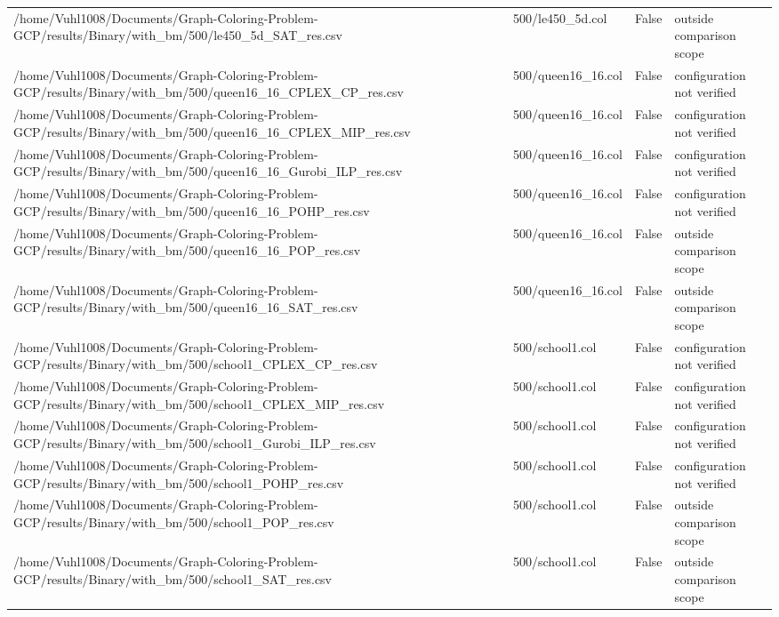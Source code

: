 \begin{table}[htbp]
\begin{tabular}{llll}
/home/Vuhl1008/Documents/Graph-Coloring-Problem-GCP/results/Binary/with\_bm/500/le450\_5d\_SAT\_res.csv & 500/le450\_5d.col & False & outside comparison scope \\
/home/Vuhl1008/Documents/Graph-Coloring-Problem-GCP/results/Binary/with\_bm/500/queen16\_16\_CPLEX\_CP\_res.csv & 500/queen16\_16.col & False & configuration not verified \\
/home/Vuhl1008/Documents/Graph-Coloring-Problem-GCP/results/Binary/with\_bm/500/queen16\_16\_CPLEX\_MIP\_res.csv & 500/queen16\_16.col & False & configuration not verified \\
/home/Vuhl1008/Documents/Graph-Coloring-Problem-GCP/results/Binary/with\_bm/500/queen16\_16\_Gurobi\_ILP\_res.csv & 500/queen16\_16.col & False & configuration not verified \\
/home/Vuhl1008/Documents/Graph-Coloring-Problem-GCP/results/Binary/with\_bm/500/queen16\_16\_POHP\_res.csv & 500/queen16\_16.col & False & configuration not verified \\
/home/Vuhl1008/Documents/Graph-Coloring-Problem-GCP/results/Binary/with\_bm/500/queen16\_16\_POP\_res.csv & 500/queen16\_16.col & False & outside comparison scope \\
/home/Vuhl1008/Documents/Graph-Coloring-Problem-GCP/results/Binary/with\_bm/500/queen16\_16\_SAT\_res.csv & 500/queen16\_16.col & False & outside comparison scope \\
/home/Vuhl1008/Documents/Graph-Coloring-Problem-GCP/results/Binary/with\_bm/500/school1\_CPLEX\_CP\_res.csv & 500/school1.col & False & configuration not verified \\
/home/Vuhl1008/Documents/Graph-Coloring-Problem-GCP/results/Binary/with\_bm/500/school1\_CPLEX\_MIP\_res.csv & 500/school1.col & False & configuration not verified \\
/home/Vuhl1008/Documents/Graph-Coloring-Problem-GCP/results/Binary/with\_bm/500/school1\_Gurobi\_ILP\_res.csv & 500/school1.col & False & configuration not verified \\
/home/Vuhl1008/Documents/Graph-Coloring-Problem-GCP/results/Binary/with\_bm/500/school1\_POHP\_res.csv & 500/school1.col & False & configuration not verified \\
/home/Vuhl1008/Documents/Graph-Coloring-Problem-GCP/results/Binary/with\_bm/500/school1\_POP\_res.csv & 500/school1.col & False & outside comparison scope \\
/home/Vuhl1008/Documents/Graph-Coloring-Problem-GCP/results/Binary/with\_bm/500/school1\_SAT\_res.csv & 500/school1.col & False & outside comparison scope \\

\end{tabular}
\end{table}
